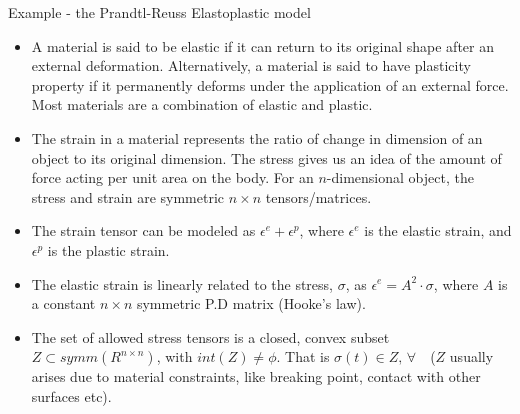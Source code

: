 \documentclass[8pt,aspectratio=169]{beamer}
\begin{document}
\begin{frame}{Example - the Prandtl-Reuss Elastoplastic model}
    \begin{itemize}
        \item A material is said to be elastic if it can return to its original shape after an external deformation. Alternatively, a material is said to have plasticity property if it permanently deforms under the application of an external force. Most materials are a combination of elastic and plastic.
        \item The strain in a material represents the ratio of change in dimension of an object to its original dimension. The stress gives us an idea of the amount of force acting per unit area on the body. For an $n$-dimensional object, the stress and strain are symmetric $n\times n$ tensors/matrices.
        \item The strain tensor can be modeled as $\epsilon^e + \epsilon^p$, where $\epsilon^e$ is the elastic strain, and $\epsilon^p$ is the plastic strain.
        \item The elastic strain is linearly related to the stress, $\sigma$, as $\epsilon^e = A^2\cdot \sigma$, where $A$ is a constant $n\times n$ symmetric P.D matrix (Hooke's law).
        \item The set of allowed stress tensors is a closed, convex subset $Z \subset symm(R^{n\times n})$, with $int(Z) \neq \phi$. That is $\sigma(t) \in Z \text{, } \forall \text{ }$ ($Z$ usually arises due to material constraints, like breaking point, contact with other surfaces etc).
    \end{itemize}
    
\end{frame}
\end{document}
